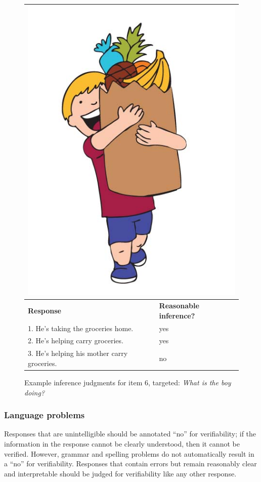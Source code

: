 \documentclass[12pt,notitlepage]{article}
\begin{document}
\begin{figure}[h]
\begin{center}
\begin{tabular}{|p{}|p{}|}
\hline
\multicolumn{2}{|c|}{\includegraphics[width=0.4\columnwidth,trim=0 0 0 -3]{figures/I06.jpg}}\\
\hline
\textbf{Response} & \textbf{Reasonable inference?}\\
\hline
1. He's taking the groceries home. & yes \\
\hline
2. He's helping carry groceries. & yes \\
\hline
3. He's helping his mother carry groceries. & no \\
\hline
\end{tabular}{}
\end{center}
\caption{Example inference judgments for item 6, targeted: \textit{What is the boy doing?}}
\label{fig:carry-groceries}
\end{figure}

\subsubsection{Language problems} Responses that are unintelligible should be annotated ``no'' for verifiability; if the information in the response cannot be clearly understood, then it cannot be verified. However, grammar and spelling problems do not automatically result in a ``no'' for verifiability. Responses that contain errors but remain reasonably clear and interpretable should be judged for verifiability like any other response.
\end{document}
